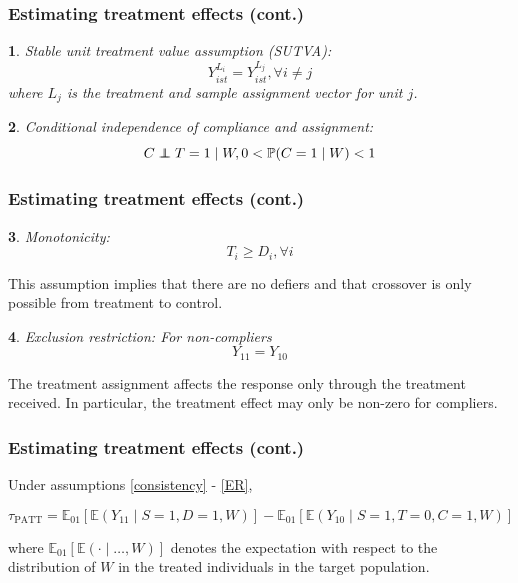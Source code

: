 \documentclass{beamer}
\makeatletter
\newtheorem*{assumption*}{\assumptionnumber}
\providecommand{\assumptionnumber}{}
\newenvironment{assumption}[2]
 {%
  \renewcommand{\assumptionnumber}{Assumption #1}%
  \begin{assumption*}%
  \protected@edef\@currentlabel{#1}%
 }
 {%
  \end{assumption*}
 }
\newcommand{\pr}{\mathbb{P}} %
\newcommand{\ex}{\mathbb{E}} %
\newcommand\independent{\protect\mathpalette{\protect\independenT}{\perp}}
\def\independenT#1#2{\mathrel{\rlap{$#1#2$}\mkern2mu{#1#2}}}
\makeatother
\begin{document}
\begin{frame}
\frametitle{Estimating treatment effects (cont.)}
\begin{assumption}{4}{}\label{sutva}
Stable unit treatment value assumption (SUTVA):
\begin{equation*}
Y_{ist}^{L_i} = Y_{ist}^{L_j},  \forall i \neq j
\end{equation*}
where $L_j$ is the treatment and sample assignment vector for unit $j$. \end{assumption}
 
\begin{assumption}{5}{}\label{compl}
Conditional independence of compliance and assignment:
\begin{equation*}
C \independent T=1 \mid W, 0 < \pr(C = 1 \mid W) < 1
\end{equation*}
\end{assumption}
\end{frame}

\begin{frame}
\frametitle{Estimating treatment effects (cont.)}
\begin{assumption}{6}{}\label{monotonicity}
Monotonicity: 
\begin{equation*}
T_i \geq D_i, \forall i
\end{equation*}
\end{assumption}
\noindent This assumption implies that there are no defiers and that crossover is only possible from treatment to control.
\begin{assumption}{7}{}\label{ER}
Exclusion restriction: For non-compliers
\begin{equation*}
Y_{11} = Y_{10}
\end{equation*}  
\end{assumption}
\noindent The treatment assignment affects the response only through the treatment received.  In particular, the treatment effect may only be non-zero for compliers.  
\end{frame}



\begin{frame}
\frametitle{Estimating treatment effects (cont.)}
\begin{theorem}\label{thm1}
Under assumptions \eqref{consistency} - \eqref{ER},

$$\tau_{\text{PATT}} = \ex_{01}\left[  \ex\left(Y_{11} \mid S=1, D=1, W\right)\right]
-\ex_{01}\left[  \ex\left(Y_{10} \mid S=1, T=0, C=1, W\right) \right] $$

where $\ex_{01}\left[\ex(\cdot \mid\dots, W)\right]$ denotes the expectation with respect to the distribution of $W$ in the treated individuals in the target population.  
\end{theorem}
\end{frame}
\end{document}
